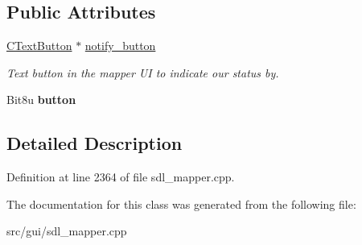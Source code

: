 \subsection*{Public Attributes}
\begin{DoxyCompactItemize}
\item 
\hypertarget{classCMouseButtonEvent_aa5be1902412eca27aa812d284fa833cb}{\hyperlink{classCTextButton}{C\-Text\-Button} $\ast$ \hyperlink{classCMouseButtonEvent_aa5be1902412eca27aa812d284fa833cb}{notify\-\_\-button}}\label{classCMouseButtonEvent_aa5be1902412eca27aa812d284fa833cb}

\begin{DoxyCompactList}\small\item\em Text button in the mapper U\-I to indicate our status by. \end{DoxyCompactList}\item 
\hypertarget{classCMouseButtonEvent_a482115b1b375fbcc166bbf6cf5c0b6e1}{Bit8u {\bfseries button}}\label{classCMouseButtonEvent_a482115b1b375fbcc166bbf6cf5c0b6e1}

\end{DoxyCompactItemize}


\subsection{Detailed Description}


Definition at line 2364 of file sdl\-\_\-mapper.\-cpp.



The documentation for this class was generated from the following file\-:\begin{DoxyCompactItemize}
\item 
src/gui/sdl\-\_\-mapper.\-cpp\end{DoxyCompactItemize}
